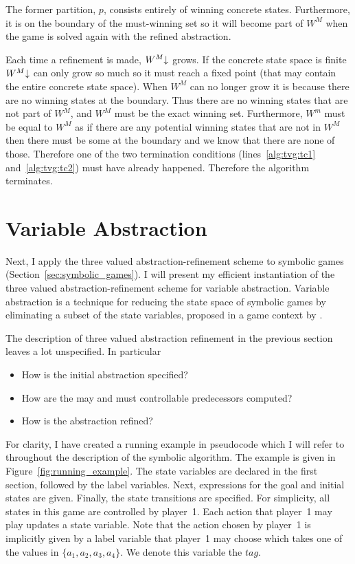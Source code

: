 The former partition, $p$, consists entirely of winning concrete states. Furthermore, it is on the boundary of the must-winning set so it will become part of $W^M$ when the game is solved again with the refined abstraction.

Each time a refinement is made, $W^M\mathord{\downarrow}$ grows. If the concrete state space is finite $W^M\mathord{\downarrow}$ can only grow so much so it must reach a fixed point (that may contain the entire concrete state space). When $W^M$ can no longer grow it is because there are no winning states at the boundary. Thus there are no winning states that are not part of $W^M$, and $W^M$ must be the exact winning set. Furthermore, $W^m$ must be equal to $W^M$ as if there are any potential winning states that are not in $W^M$ then there must be some at the boundary and we know that there are none of those. Therefore one of the two termination conditions (lines~\ref{alg:tvg:tc1} and~\ref{alg:tvg:tc2}) must have already happened. Therefore the algorithm terminates.

\section{Variable Abstraction}
\label{sec:variable_abstraction}

Next, I apply the three valued abstraction-refinement scheme to symbolic games (Section~\ref{sec:symbolic_games}). I will present my efficient instantiation of the three valued abstraction-refinement scheme for variable abstraction. Variable abstraction is a technique for reducing the state space of symbolic games by eliminating a subset of the state variables, proposed in a game context by \cite{Alfaro_Roy_07}.

The description of three valued abstraction refinement in the previous section leaves a lot unspecified. In particular

\begin{itemize}
    \item How is the initial abstraction specified?
    \item How are the may and must controllable predecessors computed?
    \item How is the abstraction refined?
\end{itemize}

For clarity, I have created a running example in pseudocode which I will refer to throughout the description of the symbolic algorithm. The example is given in Figure~\ref{fig:running_example}. The state variables are declared in the first section, followed by the label variables. Next, expressions for the goal and initial states are given. Finally, the state transitions are specified. For simplicity, all states in this game are controlled by player~1. Each action that player~1 may play updates a state variable. Note that the action chosen by player~1 is implicitly given by a label variable that player~1 may choose which takes one of the values in $\{a_1, a_2, a_3, a_4\}$. We denote this variable the $tag$.

